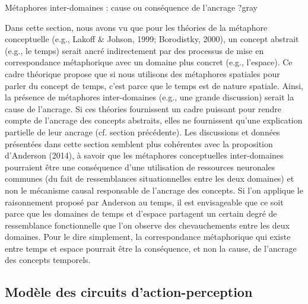 \documentclass[
  a4paper,12pt,twoside,onecolumn,openright,final,oldfontcommands]{memoir}
\newcommand\chaptercolor{gray}
\begin{document}
\vspace{2mm}

\begin{mybox}[label = meta]{Métaphores inter-domaines : cause ou conséquence de l’ancrage ?}{\chaptercolor}

Dans cette section, nous avons vu que pour les théories de la métaphore conceptuelle (e.g., Lakoff \& Johson, 1999; Borodistky, 2000), un concept abstrait (e.g., le temps) serait ancré indirectement par des processus de mise en correspondance métaphorique avec un domaine plus concret (e.g., l’espace). Ce cadre théorique propose que si nous utilisons des métaphores spatiales pour parler du concept de temps, c’est parce que le temps est de nature spatiale. Ainsi, la présence de métaphores inter-domaines (e.g., une grande discussion) serait la cause de l'ancrage. Si ces théories fournissent un cadre puissant pour rendre compte de l’ancrage des concepts abstraits, elles ne fournissent qu’une explication partielle de leur ancrage (cf. section précédente). Les discussions et données présentées dans cette section semblent plus cohérentes avec la proposition d’Anderson (2014), à savoir que les métaphores conceptuelles inter-domaines pourraient être une conséquence d’une utilisation de ressources neuronales communes (du fait de ressemblances situationnelles entre les deux domaines) et non le mécanisme causal responsable de l’ancrage des concepts. Si l’on applique le raisonnement proposé par Anderson au temps, il est envisageable que ce soit parce que les domaines de temps et d’espace partagent un certain degré de ressemblance fonctionnelle que l’on observe des chevauchements entre les deux domaines. Pour le dire simplement, la correspondance métaphorique qui existe entre temps et espace pourrait être la conséquence, et non la cause, de l’ancrage des concepts temporels. 

\end{mybox}

\hypertarget{apc}{%
\subsection{Modèle des circuits d'action-perception}\label{apc}}
\end{document}

